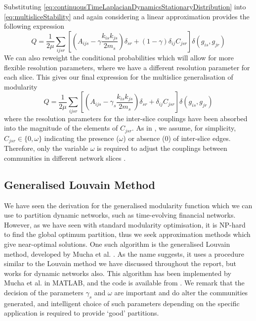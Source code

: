 Substituting \cref{eq:continuousTimeLaplacianDynamicsStationaryDistribution} into \cref{eq:multisliceStability} and again considering a linear approximation provides the following expression
\begin{equation}
	\label{eq:multisliceModularity}
	Q = \frac{1}{2\mu} \sum_{ijsr} \left[ \left( A_{ijs} - \gamma \frac{k_{is}k_{js}}{2m_{s}} \right) \delta_{sr} + (1-\gamma) \delta_{ij} C_{jsr} \right] \delta(g_{is},g_{jr})
\end{equation}
We can also reweight the conditional probabilities which will allow for more flexible resolution parameters, where we have a different resolution parameter for each slice.
This gives our final expression for the multislice generalisation of modularity
\begin{equation}
	\label{eq:multisliceModularityReweighted}
	Q = \frac{1}{2\mu} \sum_{ijsr} \left[ \left( A_{ijs} - \gamma_{s} \frac{k_{is}k_{js}}{2m_{s}} \right) \delta_{sr} + \delta_{ij} C_{jsr} \right] \delta(g_{is},g_{jr})
\end{equation}
where the resolution parameters for the inter-slice couplings have been absorbed into the magnitude of the elements of $C_{jsr}$.
As in \cite{MRM+10}, we assume, for simplicity, $C_{jsr} \in \{ 0,\omega \}$ indicating the presence ($\omega$) or absence (0) of inter-slice edges.
Therefore, only the variable $\omega$ is required to adjust the couplings between communities in different network slices \cite{BPW+13}.


\subsection{Generalised Louvain Method}
\label{subsec:generalisedLouvainMethod}

We have seen the derivation for the generalised modularity function which we can use to partition dynamic networks, such as time-evolving financial networks.
However, as we have seen with standard modularity optimisation, it is NP-hard to find the global optimum partition, thus we seek approximation methods which give near-optimal solutions.
One such algorithm is the generalised Louvain method, developed by Mucha et al. \cite{MRM+10}.
As the name suggests, it uses a procedure similar to the Louvain method we have discussed throughout the report, but works for dynamic networks also.
This algorithm has been implemented by Mucha et al. in MATLAB, and the code is available from \cite{GenLou}.
We remark that the decision of the parameters $\gamma_{s}$ and $\omega$ are important and do alter the communities generated, and intelligent choice of such parameters depending on the specific application is required to provide `good' partitions.

